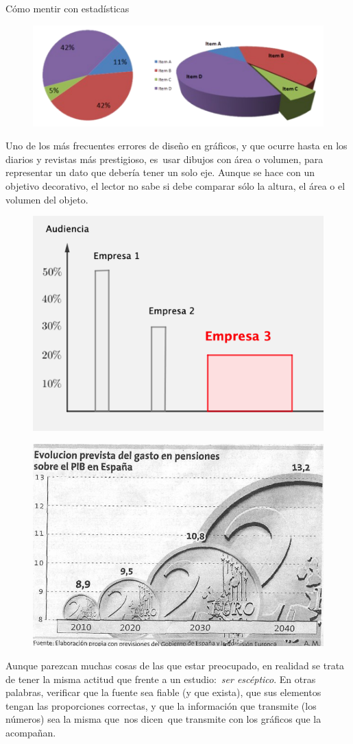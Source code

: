 \begin{myexampleblock}{Cómo mentir con estadísticas}
\begin{figure}[H]
			\centering
			\includegraphics[width=.9\textwidth]{imagenes/imagenes01/T01IM38.png}
	\end{figure}

\vspace{2mm}  Uno de los más frecuentes errores de diseño en gráficos, y que ocurre hasta en los diarios y revistas más prestigioso, es usar dibujos con área o volumen, para representar un dato que debería tener un solo eje. Aunque se hace con un objetivo decorativo, el lector no sabe si debe comparar sólo la altura, el área o el volumen del objeto.

\begin{multicols}{2}
	\begin{figure}[H]
			\centering
			\includegraphics[width=.5\textwidth]{imagenes/imagenes01/T01IM36.png}
	\end{figure}
	
	\begin{figure}[H]
			\centering
			\includegraphics[width=.5\textwidth]{imagenes/imagenes01/T01IM37.png}
	\end{figure}
\end{multicols}


\vspace{2mm}  Aunque parezcan muchas cosas de las que estar preocupado, en realidad se trata de tener la misma actitud que frente a un estudio: \emph{ser escéptico}. En otras palabras, verificar que la fuente sea fiable (y que exista), que sus elementos tengan las proporciones correctas, y que la información que transmite (los números) sea la misma que nos dicen que transmite con los gráficos que la acompañan.


\end{myexampleblock}



